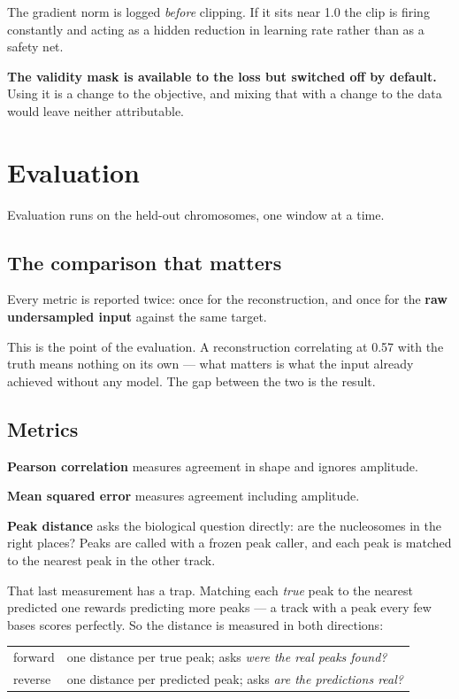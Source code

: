 \documentclass[11pt,a4paper]{article}
\begin{document}
The gradient norm is logged \emph{before} clipping. If it sits near 1.0 the clip is
firing constantly and acting as a hidden reduction in learning rate rather than as
a safety net.

\textbf{The validity mask is available to the loss but switched off by default.}
Using it is a change to the objective, and mixing that with a change to the data
would leave neither attributable.

\section{Evaluation}

Evaluation runs on the held-out chromosomes, one window at a time.

\subsection{The comparison that matters}

Every metric is reported twice: once for the reconstruction, and once for the
\textbf{raw undersampled input} against the same target.

This is the point of the evaluation. A reconstruction correlating at 0.57 with the
truth means nothing on its own --- what matters is what the input already achieved
without any model. The gap between the two is the result.

\subsection{Metrics}

\textbf{Pearson correlation} measures agreement in shape and ignores amplitude.

\textbf{Mean squared error} measures agreement including amplitude.

\textbf{Peak distance} asks the biological question directly: are the nucleosomes
in the right places? Peaks are called with a frozen peak caller, and each peak is
matched to the nearest peak in the other track.

That last measurement has a trap. Matching each \emph{true} peak to the nearest
predicted one rewards predicting more peaks --- a track with a peak every few bases
scores perfectly. So the distance is measured in both directions:

\begin{center}
\begin{tabular}{ll}
\toprule
forward & one distance per true peak; asks \emph{were the real peaks found?} \\
reverse & one distance per predicted peak; asks \emph{are the predictions real?} \\
\bottomrule
\end{tabular}
\end{center}
\end{document}
